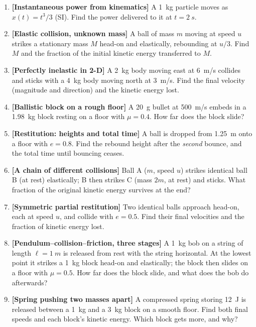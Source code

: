 \begin{enumerate}[label=\textbf{\arabic*.},itemsep=4pt]
\item \textbf{[Instantaneous power from kinematics]} A \SI{1}{kg} particle moves as $x(t)=t^3/3$ (SI).
Find the power delivered to it at $t=\SI{2}{s}$.

\item \textbf{[Elastic collision, unknown mass]} A ball of mass $m$ moving at speed $u$ strikes a
stationary mass $M$ head-on and elastically, rebounding at $u/3$. Find $M$ and the fraction of the
initial kinetic energy transferred to $M$.

\item \textbf{[Perfectly inelastic in 2-D]} A \SI{2}{kg} body moving east at \SI{6}{m/s} collides and
sticks with a \SI{4}{kg} body moving north at \SI{3}{m/s}. Find the final velocity (magnitude and
direction) and the kinetic energy lost.

\item \textbf{[Ballistic block on a rough floor]} A \SI{20}{g} bullet at \SI{500}{m/s} embeds in a
\SI{1.98}{kg} block resting on a floor with $\mu=0.4$. How far does the block slide?

\item \textbf{[Restitution: heights and total time]} A ball is dropped from \SI{1.25}{m} onto a floor
with $e=0.8$. Find the rebound height after the \emph{second} bounce, and the total time until bouncing
ceases.

\item \textbf{[A chain of different collisions]} Ball A ($m$, speed $u$) strikes identical ball B (at
rest) elastically; B then strikes C (mass $2m$, at rest) and sticks. What fraction of the original
kinetic energy survives at the end?

\item \textbf{[Symmetric partial restitution]} Two identical balls approach head-on, each at speed $u$,
and collide with $e=0.5$. Find their final velocities and the fraction of kinetic energy lost.

\item \textbf{[Pendulum--collision--friction, three stages]} A \SI{1}{kg} bob on a string of length
$\ell=\SI{1}{m}$ is
released from rest with the string horizontal. At the lowest point it strikes a \SI{1}{kg} block head-on
and elastically; the block then
slides on a floor with $\mu=0.5$. How far does the block slide, and what does the bob do afterwards?

\item \textbf{[Spring pushing two masses apart]} A compressed spring storing \SI{12}{J} is released
between a \SI{1}{kg} and a \SI{3}{kg} block on a smooth floor. Find both final speeds and each block's
kinetic energy. Which block gets more, and why?


\end{enumerate}
